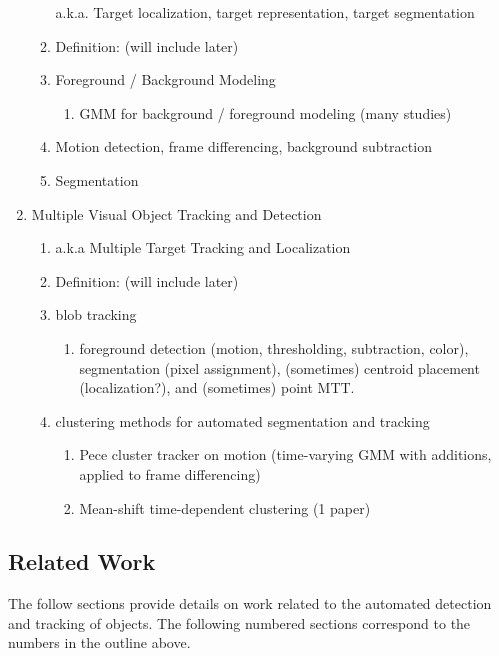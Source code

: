 \documentclass{article}
\begin{document}
\begin{enumerate}
\begin{enumerate}
	a.k.a. Target localization, target representation, target segmentation 
	\item Definition: (will include later)
	\item Foreground / Background Modeling
		\begin{enumerate}
		\item GMM for background / foreground modeling (many studies)
		\end{enumerate}
	\item Motion detection, frame differencing, background subtraction
	\item Segmentation
	\end{enumerate}
\item Multiple Visual Object Tracking and Detection
	\begin{enumerate}
	\item a.k.a Multiple Target Tracking and Localization
	\item Definition: (will include later) 
	\item blob tracking
		\begin{enumerate}
		\item foreground detection (motion, thresholding, subtraction, color), segmentation (pixel assignment), (sometimes) centroid placement (localization?), and (sometimes) point MTT.
		\end{enumerate}
	\item clustering methods for automated segmentation and tracking
		\begin{enumerate}
		\item Pece cluster tracker on motion (time-varying GMM with additions, applied to frame differencing)
		\item Mean-shift time-dependent clustering (1 paper)
		\end{enumerate}
	\end{enumerate}
\end{enumerate}




\subsection*{Related Work}
\vspace{6pt}
The follow sections provide details on work related to the automated detection and tracking of objects. The following numbered sections correspond to the numbers in the outline above.
\end{document}
